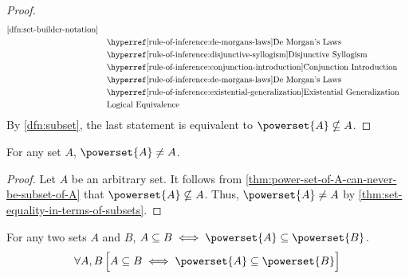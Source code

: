 \begin{proof}
\begin{equation*}
\begin{aligned}
{            \cref{dfn:set-builder-notation}}\\
            &\quad\text{\aref{rule-of-inference:de-morgans-laws}{De Morgan's Laws}}\\
            &\quad\text{\aref{rule-of-inference:disjunctive-syllogism}{Disjunctive Syllogism}}\\
            &\quad\text{\aref{rule-of-inference:conjunction-introduction}{Conjunction Introduction}}\\
            &\quad\text{\aref{rule-of-inference:de-morgans-laws}{De Morgan's Laws}}\\
            &\quad\text{\aref{rule-of-inference:existential-generalization}{Existential Generalization}}\\
            &\quad\text{Logical Equivalence}\\
        \end{aligned}
    \end{equation*}
    By \cref{dfn:subset}, the last statement is equivalent to \( \powerset{A} \nsubseteq A \).
\end{proof}

\begin{thm}
    \label{thm:power-set-of-A-is-never-equal-to-A}
    For any set \( A \), \( \powerset{A} \neq A \).
\end{thm}

\begin{proof}
    Let \( A \) be an arbitrary set. It follows from
    \cref{thm:power-set-of-A-can-never-be-subset-of-A}
    that \( \powerset{A} \nsubseteq A \). Thus,
    \( \powerset{A} \neq A \) by \cref{thm:set-equality-in-terms-of-subsets}.
\end{proof}

\begin{thm}
    \label{thm:A-is-a-subset-of-B-iff-the-power-set-of-A-is-the-subset-of-the-power-set-of-B}
    For any two sets \( A \) and \( B \), \( A \subseteq B \iff \powerset{A} \subseteq \powerset{B} \).
    \begin{equation*}
        \forall A,B \, \Big[ A \subseteq B \iff \powerset{A} \subseteq \powerset{B} \Big]
    \end{equation*}
\end{thm}

